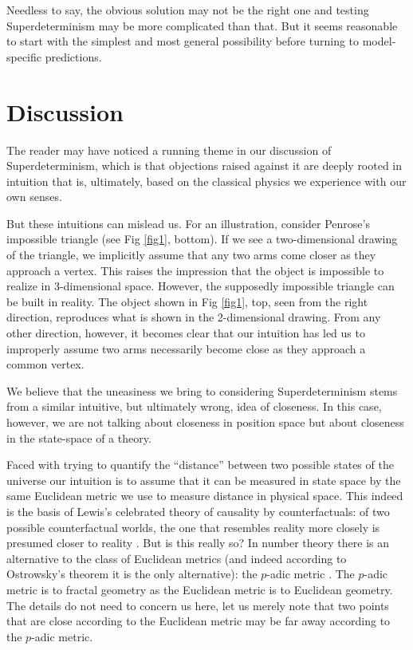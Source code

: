 \documentclass[12pt]{article}
\begin{document}
Needless to say, the obvious solution may not be the right one and testing Superdeterminism may be more complicated than that. But it seems reasonable to start with the simplest and most general possibility before turning to model-specific predictions. 

\section{Discussion}
\label{disc}

The reader may have noticed a running theme in our discussion of Superdeterminism, which is that objections raised against it are deeply rooted in intuition that is, ultimately, based on the classical physics we experience with our own senses.

But these intuitions can mislead us. For an illustration, consider Penrose's impossible triangle (see Fig \ref{fig1}, bottom). If we see a two-dimensional drawing of the triangle, we implicitly assume that any two arms come closer as they approach a vertex. This raises the impression that the object is impossible to realize in 3-dimensional space. However, the supposedly impossible triangle can be built in reality. The object shown in Fig \ref{fig1}, top, seen from the right direction, reproduces what is shown in the 2-dimensional drawing. From any other direction, however, it becomes clear that our intuition has led us to improperly assume two arms necessarily become close as they approach a common vertex. 

We believe that the uneasiness we bring to considering Superdeterminism stems from a similar intuitive, but ultimately wrong, idea of closeness. In this case, however, we are not talking about closeness in position space but about closeness in the state-space of a theory. 

 


Faced with trying to quantify the ``distance'' between two possible states of the universe our intuition is to assume that it can be measured in state space by the same Euclidean metric we use to measure distance in physical space. This indeed is the basis of Lewis's celebrated theory of causality by counterfactuals: of two possible counterfactual worlds, the one that resembles reality more closely is presumed closer to reality \cite{Lewis}. But is this really so? In number theory there is an alternative to the class of Euclidean metrics (and indeed according to Ostrowsky's theorem it is the only alternative): the $p$-adic metric \cite{Katok}. The $p$-adic metric is to fractal geometry as the Euclidean metric is to Euclidean geometry. The details do not need to concern us here, let us merely note that two points that are close according to the Euclidean metric may be far away according to the $p$-adic metric. 
\end{document}
